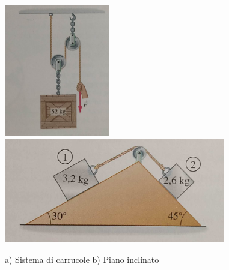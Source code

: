 \documentclass[14pt]{extarticle}
\begin{document}
\begin{figure}[h!]		
	\centering
   	\includegraphics[width=1.8in]{pictures/problemaCarrucole.png}
   	\includegraphics[width=3.8in]{pictures/problemaPianoInclinato.jpg}
  	\caption{a) Sistema di carrucole b) Piano inclinato}
   	\label{fig:carrucole}
\end{figure}


\end{document}
